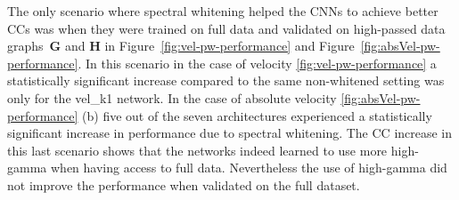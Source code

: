 The only scenario where spectral whitening helped the CNNs to achieve better CCs was when they were trained on full data and validated on high-passed data graphs~\textbf{G} and \textbf{H} in Figure~\ref{fig:vel-pw-performance} and Figure~\ref{fig:absVel-pw-performance}. 
In this scenario in the case of velocity \ref{fig:vel-pw-performance} a statistically significant increase compared to the same non-whitened setting was only for the vel\_k1 network.
In the case of absolute velocity \ref{fig:absVel-pw-performance} (b) five out of the seven architectures experienced a statistically significant increase in performance due to spectral whitening.
The CC increase in this last scenario shows that the networks indeed learned to use more high-gamma when having access to full data.
Nevertheless the use of high-gamma did not improve the performance when validated on the full dataset.  \\


